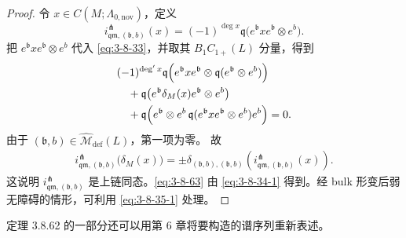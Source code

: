 \begin{proof}
令 $x\in C(M;\Lambda_{0,\mathrm{nov}})$，定义
\[
 i^\pitchfork_{\mathfrak{qm},(\mathfrak b,b)}(x)
 =
 (-1)^{\deg x}
 \mathfrak q\bigl(
 e^{\mathfrak b}xe^{\mathfrak b}\otimes e^b
 \bigr).
\]
把
$e^{\mathfrak b}xe^{\mathfrak b}\otimes e^b$
代入 \eqref{eq:3-8-33}，并取其
$B_1C_{1+}(L)$ 分量，得到
\[
\begin{aligned}
&(-1)^{\deg' x}
\mathfrak q\Bigl(
 e^{\mathfrak b}xe^{\mathfrak b}\otimes
 \mathfrak q(e^{\mathfrak b}\otimes e^b)
\Bigr)\\
&\quad+
\mathfrak q\bigl(
 e^{\mathfrak b}\delta_M(x)e^{\mathfrak b}\otimes e^b
\bigr)\\
&\quad+
\mathfrak q\Bigl(
 e^{\mathfrak b}\otimes
 e^b\,
 \mathfrak q(
  e^{\mathfrak b}xe^{\mathfrak b}\otimes e^b
 )e^b
\Bigr)
=0.
\end{aligned}
\]
由于
$(\mathfrak b,b)\in\widehat{\mathcal M}_{\mathrm{def}}(L)$，第一项为零。
故
\begin{equation}
\begin{aligned}
 i^\pitchfork_{\mathfrak{qm},(\mathfrak b,b)}
 \bigl(\delta_M(x)\bigr)
 =
 \pm\delta_{(\mathfrak b,b),(\mathfrak b,b)}
 \left(
 i^\pitchfork_{\mathfrak{qm},(\mathfrak b,b)}(x)
 \right).
\end{aligned}
\tag{3.8.64}\label{eq:3-8-64}
\end{equation}
这说明
$i^\pitchfork_{\mathfrak{qm},(\mathfrak b,b)}$
是上链同态。\eqref{eq:3-8-63} 由
\eqref{eq:3-8-34-1} 得到。经 bulk 形变后弱无障碍的情形，可利用
\eqref{eq:3-8-35-1} 处理。
\end{proof}

定理 3.8.62 的一部分还可以用第 6 章将要构造的谱序列重新表述。
